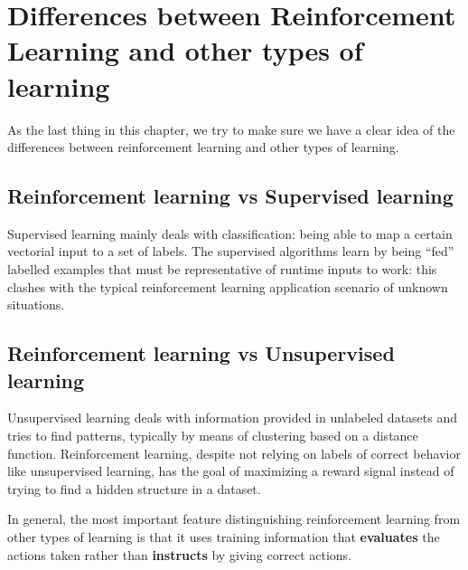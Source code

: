 \section{Differences between Reinforcement Learning and other types of learning}
As the last thing in this chapter, we try to make sure we have a clear idea of the differences between reinforcement learning and other types of learning.

\subsection{Reinforcement learning vs Supervised learning}
Supervised learning mainly deals with classification: being able to map a certain vectorial input to a set of labels. The supervised algorithms learn by being ``fed'' labelled examples that must be representative of runtime inputs to work: this clashes with the typical reinforcement learning application scenario of unknown situations.

\subsection{Reinforcement learning vs Unsupervised learning}
Unsupervised learning deals with information provided in unlabeled datasets and tries to find patterns, typically by means of clustering based on a distance function. Reinforcement learning, despite not relying on labels of correct behavior like unsupervised learning, has the goal of maximizing a reward signal instead of trying to find a hidden structure in a dataset.

In general, the most important feature distinguishing reinforcement learning from other types of learning is that it uses training information that \textbf{evaluates} the actions taken rather than \textbf{instructs} by giving correct actions.